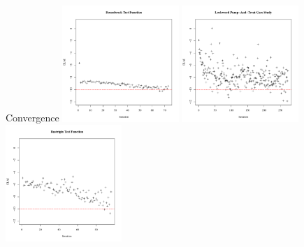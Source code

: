 \documentclass[ xcolor = pdftex, dvipsnames, table ]{beamer}
\begin{document}
\subsection{}
\begin{frame}{Convergence}
\includegraphics[width=0.33\textwidth]{introChartRoseEasyEasyAxis.pdf}
\includegraphics[width=0.33\textwidth]{introChartLock6Three20000Axis.pdf}
\includegraphics[width=0.33\textwidth]{introChartRastHardAxis.pdf}
\end{frame}

%
%
\end{document}
